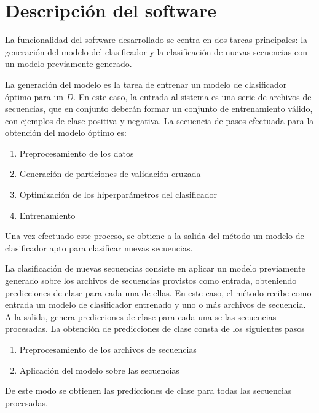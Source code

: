 %
%
%
%
\chapter{Descripción del software}
%
La funcionalidad del software desarrollado se centra en dos tareas
principales: la generación del modelo del clasificador y la
clasificación de nuevas secuencias con un modelo previamente
generado.

La generación del modelo es la tarea de entrenar un modelo de
clasificador óptimo para un  $D$.  En
este caso, la entrada al sistema es una serie de archivos de
secuencias, que en conjunto deberán formar un conjunto de
entrenamiento válido, con ejemplos de clase positiva y negativa.
La secuencia de pasos efectuada para la obtención del modelo óptimo
es:
%
\begin{enumerate}
\item Preprocesamiento de los datos
\item Generación de particiones de validación cruzada
\item Optimización de los hiperparámetros del clasificador
\item Entrenamiento
\end{enumerate}
%
Una vez efectuado este proceso, se obtiene a la salida del método un
modelo de clasificador apto para clasificar nuevas secuencias.

La clasificación de nuevas secuencias consiste en aplicar un modelo
previamente generado sobre los archivos de secuencias provistos como
entrada, obteniendo predicciones de clase para cada una de ellas. En
este caso, el método recibe como entrada un modelo de clasificador
entrenado y uno o más archivos de secuencia.  A la salida, genera
predicciones de clase para cada una se las secuencias procesadas.  La
obtención de predicciones de clase consta de los siguientes pasos
%
\begin{enumerate}
\item Preprocesamiento de los archivos de secuencias
\item Aplicación del modelo sobre las secuencias
\end{enumerate}
%
De este modo se obtienen las predicciones de clase para todas las
secuencias procesadas.

